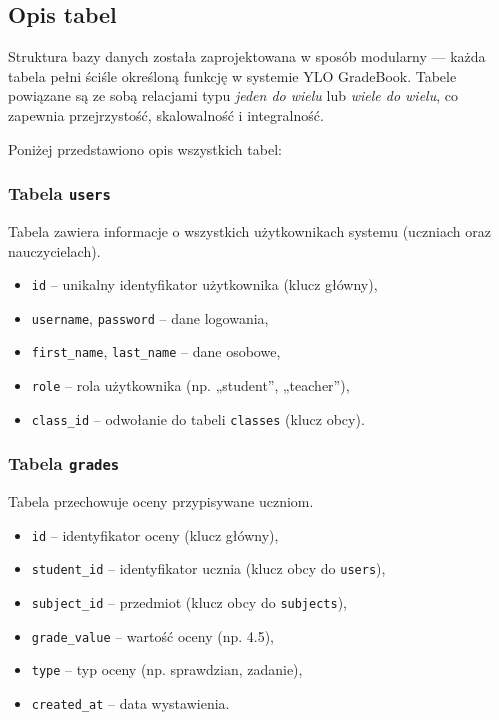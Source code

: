\subsection{Opis tabel}

Struktura bazy danych została zaprojektowana w sposób modularny — każda tabela pełni ściśle określoną funkcję w systemie YLO GradeBook. Tabele powiązane są ze sobą relacjami typu \textit{jeden do wielu} lub \textit{wiele do wielu}, co zapewnia przejrzystość, skalowalność i integralność.

Poniżej przedstawiono opis wszystkich tabel:
\subsubsection*{Tabela \texttt{users}}

Tabela zawiera informacje o wszystkich użytkownikach systemu (uczniach oraz nauczycielach).

\begin{itemize}
    \item \texttt{id} – unikalny identyfikator użytkownika (klucz główny),
    \item \texttt{username}, \texttt{password} – dane logowania,
    \item \texttt{first\_name}, \texttt{last\_name} – dane osobowe,
    \item \texttt{role} – rola użytkownika (np. „student”, „teacher”),
    \item \texttt{class\_id} – odwołanie do tabeli \texttt{classes} (klucz obcy).
\end{itemize}

\subsubsection*{Tabela \texttt{grades}}

Tabela przechowuje oceny przypisywane uczniom.

\begin{itemize}
    \item \texttt{id} – identyfikator oceny (klucz główny),
    \item \texttt{student\_id} – identyfikator ucznia (klucz obcy do \texttt{users}),
    \item \texttt{subject\_id} – przedmiot (klucz obcy do \texttt{subjects}),
    \item \texttt{grade\_value} – wartość oceny (np. 4.5),
    \item \texttt{type} – typ oceny (np. sprawdzian, zadanie),
    \item \texttt{created\_at} – data wystawienia.
\end{itemize}

